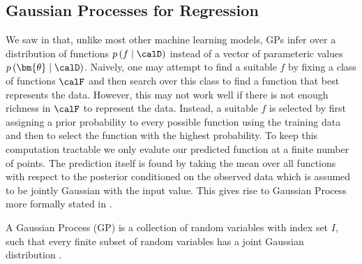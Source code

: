 \subsection{Gaussian Processes for Regression}\label{Section1.5}

We saw in  that, unlike most other machine learning models, GPs infer over a distribution of functions $p \left( f \mid \calD \right)$ instead of a vector of parameteric values $p \left( \bm{\theta} \mid \calD \right)$. Naively, one may attempt to find a suitable $f$ by fixing a class of functions $\calF$ and then search over this class to find a function that best represents the data. However, this may not work well if there is not enough richness in $\calF$ to represent the data. Instead, a suitable $f$ is selected by first assigning a prior probability to every possible function using the training data and then to select the function with the highest probability. To keep this computation tractable we only evalute our predicted function at a finite number of points. The prediction itself is found by taking the mean over all functions with respect to the posterior conditioned on the observed data which is assumed to be jointly Gaussian with the input value. This gives rise to Gaussian Process more formally stated in .

\begin{defe} \label{defe: GP}
    A Gaussian Process (GP) is a collection of random variables with index set $I$, such that every finite subset of random variables has a joint Gaussian distribution \cite{RasmussenCarlEdward2006Gpfm,MurphyKevinP2012Ml}.
\end{defe}

